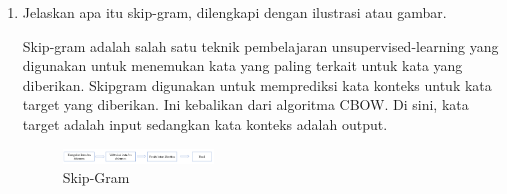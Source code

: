 \begin{enumerate}
\item Jelaskan apa itu skip-gram, dilengkapi dengan ilustrasi atau gambar.

Skip-gram adalah salah satu teknik pembelajaran unsupervised-learning yang
digunakan untuk menemukan kata yang paling terkait untuk kata yang diberikan. Skipgram digunakan untuk memprediksi kata konteks untuk kata target yang diberikan. Ini
kebalikan dari algoritma CBOW. Di sini, kata target adalah input sedangkan kata
konteks adalah output. 

\begin{figure}
	\includegraphics[width=4cm]{figures/1174062/5/teori1.png}
	\centering
	\caption{Skip-Gram}
\end{figure}
\end{enumerate}

